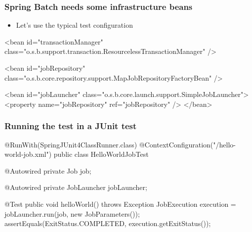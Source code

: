\begin{frame}[fragile]
\frametitle{Spring Batch needs some infrastructure beans}
\begin{itemize}
 \item Let's use the typical test configuration
\end{itemize}

\begin{xmlcode}
<bean id="transactionManager"
      class="o.s.b.support.transaction.ResourcelessTransactionManager" />

<bean id="jobRepository"   
      class="o.s.b.core.repository.support.MapJobRepositoryFactoryBean" />

<bean id="jobLauncher"
      class="o.s.b.core.launch.support.SimpleJobLauncher">
  <property name="jobRepository" ref="jobRepository" />
</bean>
\end{xmlcode}
\end{frame}

\begin{frame}[fragile]
\frametitle{Running the test in a JUnit test}

\begin{javacode}
@RunWith(SpringJUnit4ClassRunner.class)
@ContextConfiguration("/hello-world-job.xml")
public class HelloWorldJobTest {

  @Autowired
  private Job job;

  @Autowired
  private JobLauncher jobLauncher;

  @Test public void helloWorld() throws Exception {
    JobExecution execution = jobLauncher.run(job, new JobParameters());
    assertEquals(ExitStatus.COMPLETED, execution.getExitStatus());
  }
}
\end{javacode}
\end{frame}
